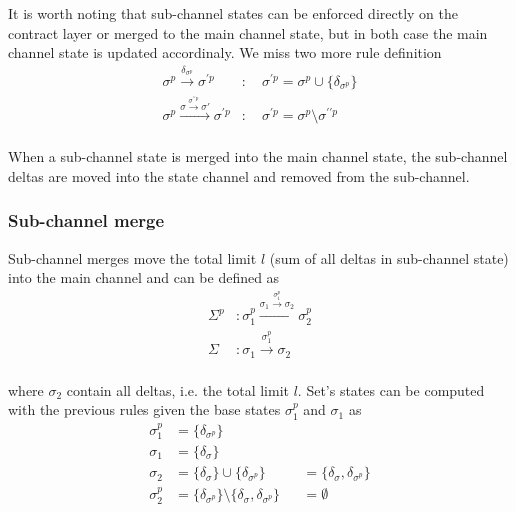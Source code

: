 \documentclass{llncs}
\begin{document}
It is worth noting that sub-channel states can be enforced directly on the contract layer or merged to the main channel state, but in both case the main channel state is updated accordinaly. We miss two more rule definition
\begin{equation*}
\begin{split}
    \sigma^p \xrightarrow{\delta_{\sigma^p}} \sigma^{\prime p} &: \quad \sigma^{\prime p} = \sigma^p \cup \{ \delta_{\sigma^p} \} \\
    \sigma^p \xrightarrow{\sigma \xrightarrow{\sigma^{\prime\prime p}} \sigma'} \sigma^{\prime p} &: \quad \sigma^{\prime p} = \sigma^p \setminus \sigma^{\prime\prime p} \\
\end{split}
\end{equation*}

When a sub-channel state is merged into the main channel state, the sub-channel deltas are moved into the state channel and removed from the sub-channel.

\subsubsection{Sub-channel merge} Sub-channel merges move the total limit $l$ (sum of all deltas in sub-channel state) into the main channel and can be defined as
\begin{equation*}
\begin{split}
    \Sigma^p&: \sigma_1^p \xrightarrow{\sigma_1 \xrightarrow{\sigma_1^p} \sigma_2} \sigma_2^p \\
    \Sigma&: \sigma_1 \xrightarrow{\sigma_1^p} \sigma_2 \\
\end{split}
\end{equation*}

where $\sigma_2$ contain all deltas, i.e. the total limit $l$. Set's states can be computed with the previous rules given the base states $\sigma^p_1$ and $\sigma_1$ as
\begin{align*}
    \sigma^p_1 &= \{\delta_{\sigma^p}\} \\
    \sigma_1   &= \{\delta_\sigma\} \\
    \sigma_2   &= \{\delta_\sigma\} \cup \{\delta_{\sigma^p}\} & &= \{\delta_\sigma,\delta_{\sigma^p}\} \\
    \sigma^p_2 &= \{\delta_{\sigma^p}\} \setminus \{\delta_\sigma,\delta_{\sigma^p}\} & &= \emptyset
\end{align*}
\end{document}
